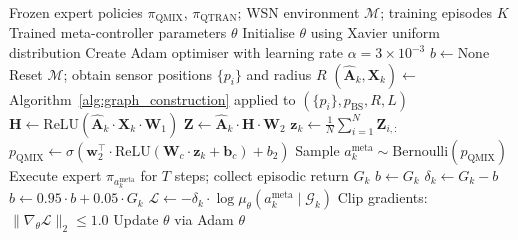 \begin{algorithm}[H]
\caption{GAPF Training --- Pseudocode (CAS Mode)}
\label{alg:gapf_training}
\begin{algorithmic}[1]
\REQUIRE Frozen expert policies $\pi_{\text{QMIX}}$, $\pi_{\text{QTRAN}}$; WSN environment $\mathcal{M}$; training episodes $K$
\ENSURE Trained meta-controller parameters $\theta$
\STATE {}
\STATE Initialise $\theta$ using Xavier uniform distribution
\STATE Create Adam optimiser with learning rate $\alpha = 3 \times 10^{-3}$
\STATE $b \leftarrow \text{None}$ 
    \STATE {}
    \STATE Reset $\mathcal{M}$; obtain sensor positions $\{p_i\}$ and radius $R$
    \STATE $(\hat{\mathbf{A}}_k, \mathbf{X}_k) \leftarrow$ Algorithm~\ref{alg:graph_construction} applied to $(\{p_i\}, p_{\text{BS}}, R, L)$
    \STATE $\mathbf{H} \leftarrow \text{ReLU}(\hat{\mathbf{A}}_k \cdot \mathbf{X}_k \cdot \mathbf{W}_1)$ 
    \STATE $\mathbf{Z} \leftarrow \hat{\mathbf{A}}_k \cdot \mathbf{H} \cdot \mathbf{W}_2$ 
    \STATE $\mathbf{z}_k \leftarrow \frac{1}{N}\sum_{i=1}^{N} \mathbf{Z}_{i,:}$ 
    \STATE {}
    \STATE $p_{\text{QMIX}} \leftarrow \sigma(\mathbf{w}_2^\top \cdot \text{ReLU}(\mathbf{W}_c \cdot \mathbf{z}_k + \mathbf{b}_c) + b_2)$ 
    \STATE Sample $a^{\text{meta}}_k \sim \text{Bernoulli}(p_{\text{QMIX}})$ 
    \STATE Execute expert $\pi_{a^{\text{meta}}_k}$ for $T$ steps; collect episodic return $G_k$
    \STATE {}
        \STATE $b \leftarrow G_k$ 
    \ENDIF
    \STATE $\delta_k \leftarrow G_k - b$ 
    \STATE $b \leftarrow 0.95 \cdot b + 0.05 \cdot G_k$ 
    \STATE {}
        \STATE $\mathcal{L} \leftarrow -\delta_k \cdot \log \mu_\theta(a^{\text{meta}}_k \mid \mathcal{G}_k)$ 
        \STATE Clip gradients: $\|\nabla_\theta \mathcal{L}\|_2 \leq 1.0$
        \STATE Update $\theta$ via Adam
    \ENDIF
\ENDFOR
\RETURN $\theta$
\end{algorithmic}
\end{algorithm}

